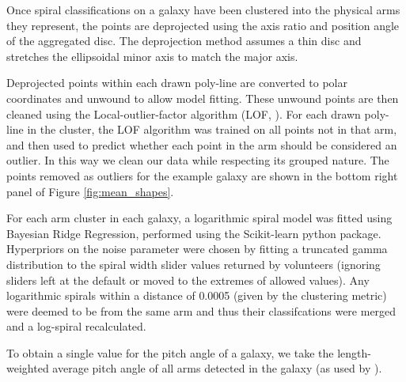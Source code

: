 \documentclass[../main.tex]{subfiles}
\begin{document}
Once spiral classifications on a galaxy have been clustered into the physical arms they represent, the points are deprojected using the axis ratio and position angle of the aggregated disc. The deprojection method assumes a thin disc and stretches the ellipsoidal minor axis to match the major axis.

Deprojected points within each drawn poly-line are converted to polar coordinates and unwound to allow model fitting. These unwound points are then cleaned using the Local-outlier-factor algorithm (LOF, \citealt{local-outlier-factor}). For each drawn poly-line in the cluster, the LOF algorithm was trained on all points not in that arm, and then used to predict whether each point in the arm should be considered an outlier. In this way we clean our data while respecting its grouped nature. The points removed as outliers for the example galaxy are shown in the bottom right panel of Figure \ref{fig:mean_shapes}.

\begin{figure*}
  \caption{Calculated aggregate components for UGC 4721. The aggregate disc is shown using a dot-dashed line and blue fill in the upper left panel, the aggregate bulge with a dotted line and orange fill in the upper right panel, the aggregate bar using a dashed line and green fill in the lower left panel and the aggregate spiral arms are plotted as red lines in the lower right panel. S\'ersic components are displayed at twice their effective radii. Black crosses in the lower right panel indicate spiral arm points that were identified as outliers and removed during cleaning (described in Section \ref{sec:spiral_clustering}).}
  \label{fig:mean_shapes}
\end{figure*}


For each arm cluster in each galaxy, a logarithmic spiral model was fitted using Bayesian Ridge Regression, performed using the Scikit-learn python package. Hyperpriors on the noise parameter were chosen by fitting a truncated gamma distribution \citep{2014arXiv1401.0287Z} to the spiral width slider values returned by volunteers (ignoring sliders left at the default or moved to the extremes of allowed values). Any logarithmic spirals within a distance of 0.0005 (given by the clustering metric) were deemed to be from the same arm and thus their classifcations were merged and a log-spiral recalculated.

To obtain a single value for the pitch angle of a galaxy, we take the length-weighted average pitch angle of all arms detected in the galaxy (as used by \citealt{Davis2014:1402.1910v1}).
\end{document}
